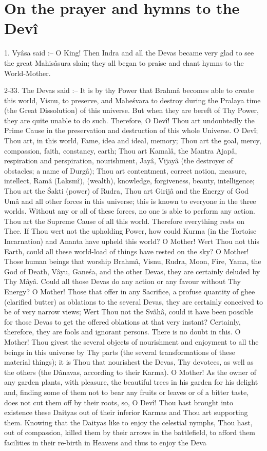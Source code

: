 ﻿\chapter{On the prayer and hymns to the Dev\^i}

1. Vy\^asa said :-- O King! Then Indra and all the Devas became very glad to see the great Mahis\^asura slain; they all began to praise and chant hymns to the World-Mother.

2-33. The Devas said :-- It is by thy Power that Brahm\^a becomes able to create this world, Visnu, to preserve, and Mahe\'svara to destroy during the Pralaya time (the Great Dissolution) of this universe. But when they are bereft of Thy Power, they are quite unable to do such. Therefore, O Dev\^i! Thou art undoubtedly the Prime Cause in the preservation and destruction of this whole Universe. O Dev\^i; Thou art, in this world, Fame, idea and ideal, memory; Thou art the goal, mercy, compassion, faith, constancy, earth; Thou art Kamal\^a, the Mantra Ajap\^a, respiration and perspiration, nourishment, Jay\^a, Vijay\^a (the destroyer of obstacles; a name of Durg\^a); Thou art contentment, correct notion, measure, intellect, Ram\^a (Laksm\^i), (wealth), knowledge, forgiveness, beauty, intelligence; Thou art the \'Sakti (power) of Rudra, Thou art Girij\^a and the Energy of God Um\^a and all other forces in this universe; this is known to everyone in the three worlds. Without any or all of these forces, no one is able to perform any action. Thou art the Supreme Cause of all this world. Therefore everything rests on Thee. If Thou wert not the upholding Power, how could Kurma (in the Tortoise Incarnation) and Ananta have upheld this world? O Mother! Wert Thou not this Earth, could all these world-load of things have rested on the sky? O Mother! Those human beings that worship Brahm\^a, Visnu, Rudra, Moon, Fire, Yama, the God of Death, V\^ayu, Gane\'sa, and the other Devas, they are certainly deluded by Thy M\^ay\^a. Could all those Devas do any action or any favour without Thy Energy? O Mother! Those that offer in any Sacrifice, a profuse quantity of ghee (clarified butter) as oblations to the several Devas, they are certainly conceived to be of very narrow views; Wert Thou not the Sv\^ah\^a, could it have been possible for those Devas to get the offered oblations at that very instant? Certainly, therefore, they are fools and ignorant persons. There is no doubt in this. O Mother! Thou givest the several objects of nourishment and enjoyment to all the beings in this universe by Thy parts (the several transformations of these material things); it is Thou that nourishest the Devas, Thy devotees, as well as the others (the D\^anavas, according to their Karma). O Mother! As the owner of any garden plants, with pleasure, the beautiful trees in his garden for his delight and, finding some of them not to bear any fruits or leaves or of a bitter taste, does not cut them off by their roots, so, O Dev\^i! Thou hast brought into existence these Daityas out of their inferior Karmas and Thou art supporting them. Knowing that the Daityas like to enjoy the celestial nymphs, Thou hast, out of compassion, killed them by their arrows in the battlefield, to afford them facilities in their re-birth in Heavens and thus to enjoy the Deva 